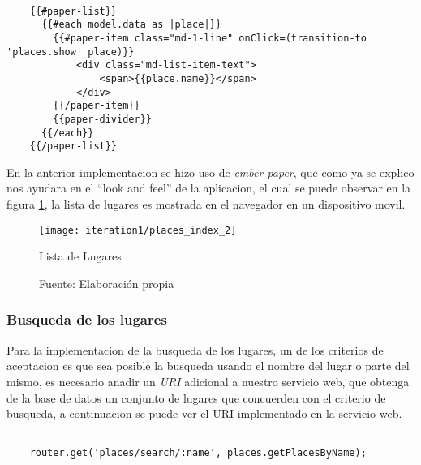 \begin{center}
  \begin{lstlisting}[label=template_places_index,caption=Template de la lista de lugares]

    {{#paper-list}}
      {{#each model.data as |place|}}
        {{#paper-item class="md-1-line" onClick=(transition-to 'places.show' place)}}
            <div class="md-list-item-text">
                <span>{{place.name}}</span>
            </div>
        {{/paper-item}}
        {{paper-divider}}
      {{/each}}
    {{/paper-list}}

  \end{lstlisting}
\end{center}

En la anterior implementacion se hizo uso de \emph{ember-paper}, que como ya se explico nos ayudara en el ``look and feel'' de la aplicacion, el cual se puede observar en la figura \ref{fig:places_index}, la lista de lugares es mostrada en el navegador en un dispositivo movil.


\begin{figure}[H]
  \begin{center}
    \texttt{[image: iteration1/places\_index\_2]}
    \caption{Lista de Lugares}
    \label{fig:places_index}
    \caption*{Fuente: Elaboración propia}
  \end{center}
\end{figure}


\subsubsection{Busqueda de los lugares}
\label{subs:busqueda de los lugares}

Para la implementacion de la busqueda de los lugares, un de los criterios de aceptacion es que sea posible la busqueda usando el nombre del lugar o parte del mismo, es necesario anadir un \emph{URI} adicional a nuestro servicio web, que obtenga de la base de datos un conjunto de lugares que concuerden con el criterio de busqueda, a continuacion se puede ver el URI implementado en la servicio web. \\

\begin{center}
  \begin{lstlisting}[label=endpoint_search_place,caption=Implementacion de la busqueda de lugares en el Servicio Web]

    router.get('places/search/:name', places.getPlacesByName);

  \end{lstlisting}
\end{center}


